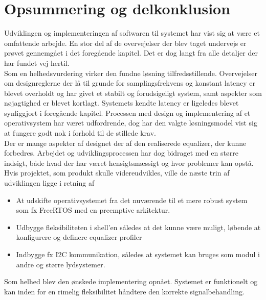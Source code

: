 \section{Opsummering og delkonklusion}
Udviklingen og implementeringen af softwaren til systemet har vist sig at være et omfattende arbejde.
En stor del af de overvejelser der blev taget undervejs er prøvet gennemgået i det foregående kapitel.
Det er dog langt fra alle detaljer der har fundet vej hertil.\\

Som en helhedsvurdering virker den fundne løsning tilfredsstillende.
Overvejelser om designreglerne der lå til grunde for samplingsfrekvens og konstant latency er blevet overholdt og har givet et stabilt og forudsigeligt system, samt aspekter som nøjagtighed er blevet kortlagt.
Systemets kendte latency er ligeledes blevet synliggjort i foregående kapitel.
Processen med design og implementering af et operativsystem har været udfordrende, dog har den valgte løsningsmodel vist sig at fungere godt nok i forhold til de stillede krav.\\

Der er mange aspekter af designet der af den realiserede equalizer, der kunne forbedres.
Arbejdet og udviklingsprocessen har dog bidraget med en større indsigt, både hvad der har været hensigtsmæssigt og hvor problemer kan opstå.\\

Hvis projektet, som produkt skulle videreudvikles, ville de næste trin af udviklingen ligge i retning af
\begin{itemize}[noitemsep]
	\item At udskifte operativsystemet fra det nuværende til et mere robust system som fx FreeRTOS med en preemptive arkitektur.
	\item Udbygge fleksibiliteten i shell'en således at det kunne være muligt, løbende at konfigurere og definere equalizer profiler
	\item Indbygge fx I2C kommunikation, således at systemet kan bruges som modul i andre og større lydsystemer.
\end{itemize} 

Som helhed blev den ønskede implementering opnået.
Systemet er funktionelt og kan inden for en rimelig fleksibilitet håndtere den korrekte signalbehandling.

